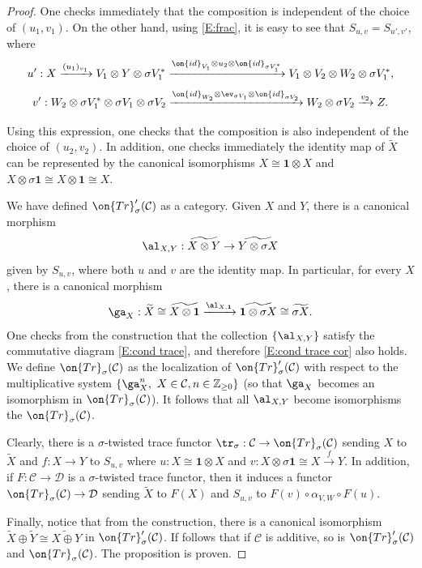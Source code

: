 \documentclass[11pt]{amsart}
\theoremstyle{definition}
\theoremstyle{definition}
\theoremstyle{definition}
\numberwithin{equation}{subsection}
\newcommand{\bZ}{{\mathbb Z}}
\newcommand{\mC}{{\mathcal C}}
\newcommand{\mD}{{\mathcal D}}
\newcommand{\id}{{\on{id}}}
\newcommand{\Tr}{{\on{Tr}}}
\begin{document}
\begin{proof}
One checks immediately that the composition is independent of the choice of $(u_1,v_1)$.  On the other hand, using \eqref{E:frac}, it is easy to see that $S_{u,v}=S_{u',v'}$, where
\[
u': X\xrightarrow{(u_1)_{v_1}} V_1\otimes Y\otimes \sigma V^*_1\xrightarrow{\id_{V_1}\otimes u_2\otimes \id_{\sigma V^*_1}} V_1\otimes V_2\otimes W_2\otimes \sigma V^*_1, 
\]
\[
v': W_2\otimes \sigma V^*_1 \otimes \sigma V_1\otimes \sigma V_2 \xrightarrow{\id_{W_2}\otimes\ev_{\sigma V_1}\otimes\id_{\sigma V_2}}W_2\otimes \sigma V_2\xrightarrow{v_2} Z.
\]


Using this expression, one checks that the composition is also independent of the choice of $(u_2,v_2)$. 
In addition, one checks immediately  the identity map of $\widetilde{X}$ can be represented by the canonical isomorphisms $X\cong  \mathbf{1}\otimes X$ and $X\otimes \sigma \mathbf{1}\cong X\otimes\mathbf{1}\cong X$.

We have defined $\Tr'_\sigma(\mC)$ as a category.  Given $X$ and $Y$, there is a canonical morphism
\[\al_{X,Y}:\widetilde{X\otimes Y}\to \widetilde{Y\otimes \sigma X}\]
given by $S_{u,v}$, where both $u$ and $v$ are the identity map. 
In particular, for every $X$, there is a canonical morphism
$$\ga_{X}:\widetilde{X}\cong \widetilde{X\otimes\mathbf{1}}\xrightarrow{\al_{X,\mathbf{1}}} \widetilde{\mathbf{1}\otimes \sigma X}\cong \widetilde{\sigma X}.$$
One checks from the construction that the collection $\{\al_{X,Y}\}$ satisfy the commutative diagram \eqref{E:cond trace}, and therefore \eqref{E:cond trace cor} also holds.
We define $\Tr_\sigma(\mC)$ as the localization of $\Tr'_\sigma(\mC)$ with respect to the multiplicative system $\{\ga^n_X,\ X\in \mC, n\in \bZ_{\geq 0}\}$ (so that $\ga_X$ becomes an isomorphism in $\Tr_\sigma(\mC)$). It follows that all $\al_{X,Y}$ become isomorphisms the $\Tr_\sigma(\mC)$.

Clearly, there is a $\sigma$-twisted trace functor $\tr_\sigma: \mC\to \Tr_\sigma (\mC)$ sending $X$ to $\widetilde{X}$ and $f:X\to Y$ to $S_{u,v}$ where $u: X\cong \mathbf{1}\otimes X$ and $v: X\otimes\sigma\mathbf{1}\cong X\xrightarrow{f} Y$. In addition, if $F: \mC\to \mD$ is a $\sigma$-twisted trace functor, then it induces a functor $\Tr_\sigma(\mC)\to \mD$ sending $\widetilde X$ to $F(X)$ and $S_{u,v}$ to $F(v)\circ \alpha_{V,W}\circ F(u)$. 

Finally, notice that from the construction, there is a canonical isomorphism $\widetilde{X}\oplus\widetilde{Y}\cong\widetilde{X\oplus Y}$ in $\Tr'_\sigma(\mC)$. If follows that if $\mC$ is additive, so is $\Tr'_\sigma(\mC)$ and $\Tr_\sigma(\mC)$. The proposition is proven.
\end{proof}
\end{document}

